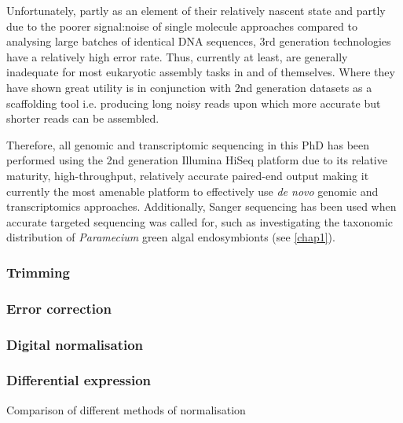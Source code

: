 
Unfortunately, partly as an element of their relatively nascent state and partly due to the
poorer signal:noise of single molecule approaches compared to analysing large 
batches of identical DNA sequences, 3rd generation technologies have a relatively high error rate.
Thus, currently at least, are generally inadequate for most eukaryotic assembly tasks in and of themselves.
Where they have shown great utility is in conjunction with 2nd generation datasets
as a scaffolding tool i.e. producing long noisy reads upon which more accurate but shorter
reads can be assembled.


Therefore, all genomic and transcriptomic sequencing in this PhD has been performed using the 2nd generation
Illumina HiSeq platform due to its relative maturity, high-throughput, relatively accurate
paired-end output making it currently the most amenable platform to effectively
use \textit{de novo} genomic and transcriptomics approaches.  Additionally, Sanger sequencing
has been used when accurate targeted sequencing was called for, such as investigating the
taxonomic distribution of \textit{Paramecium} green algal endosymbionts (see \ref{chap1}).



\subsubsection{Trimming}
\subsubsection{Error correction}
\subsubsection{Digital normalisation}


\subsubsection{Differential expression}

Comparison of different methods of normalisation \citep{Dillies2013}




